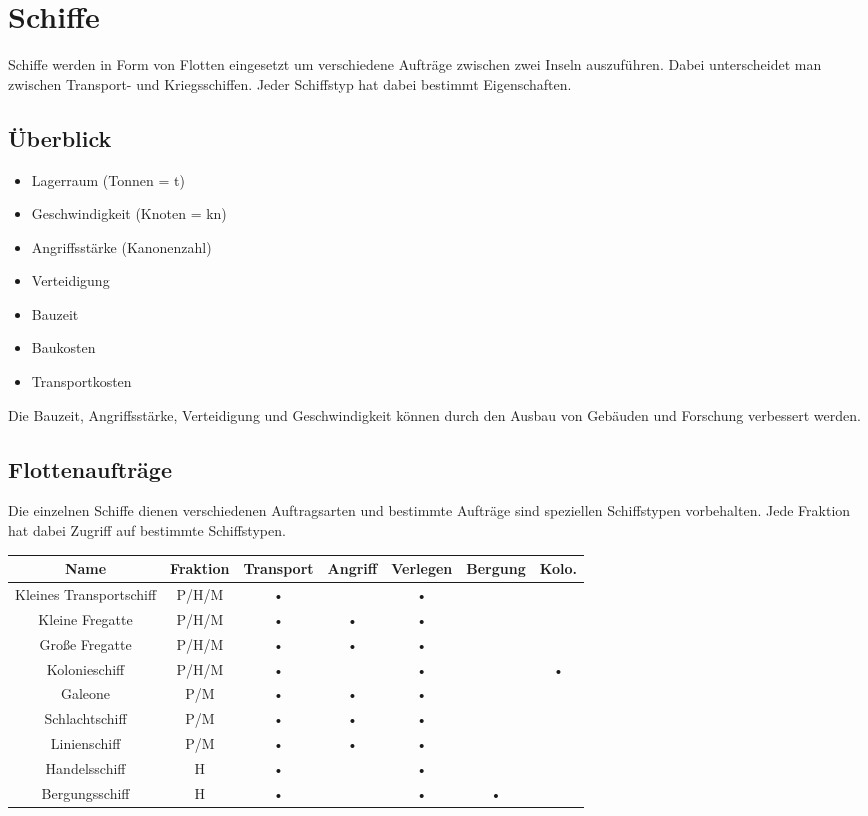 \documentclass[10pt,a4paper]{article}
\begin{document}
\section{Schiffe}

Schiffe werden in Form von Flotten eingesetzt um verschiedene Aufträge zwischen zwei Inseln auszuführen. Dabei unterscheidet man zwischen Transport- und Kriegsschiffen. Jeder Schiffstyp hat dabei bestimmt Eigenschaften.

\subsection{Überblick}
\begin{itemize}
\item Lagerraum (Tonnen = t) 
\item Geschwindigkeit (Knoten = kn)
\item Angriffsstärke (Kanonenzahl)
\item Verteidigung 
\item Bauzeit
\item Baukosten
\item Transportkosten
\end{itemize}

Die Bauzeit, Angriffsstärke, Verteidigung und Geschwindigkeit können durch den Ausbau von Gebäuden und Forschung verbessert werden.

\subsection{Flottenaufträge}

Die einzelnen Schiffe dienen verschiedenen Auftragsarten und bestimmte Aufträge sind speziellen Schiffstypen vorbehalten. Jede Fraktion hat dabei Zugriff auf bestimmte Schiffstypen.
\\[3mm]
\begin{tabular}{|c|c|c|c|c|c|c|}
\hline 
Name & Fraktion & Transport & Angriff & Verlegen & Bergung & Kolo. \\ 
\hline 
Kleines Transportschiff & P/H/M & • &  & • &  &  \\ 
\hline 
Kleine Fregatte & P/H/M & • & • & • &  &  \\ 
\hline 
Große Fregatte & P/H/M & • & • & • &  &  \\ 
\hline 
Kolonieschiff & P/H/M & • &  & • &  & • \\ 
\hline 
Galeone & P/M & • & • & • &  &  \\ 
\hline 
Schlachtschiff & P/M & • & • & • &  &  \\ 
\hline 
Linienschiff & P/M & • & • & • &  &  \\ 
\hline 
Handelsschiff & H & • &  & • &  &  \\ 
\hline 
Bergungsschiff & H & • &  & • & • &  \\ 
\hline 
\end{tabular} 
\\[3mm]
\end{document}
